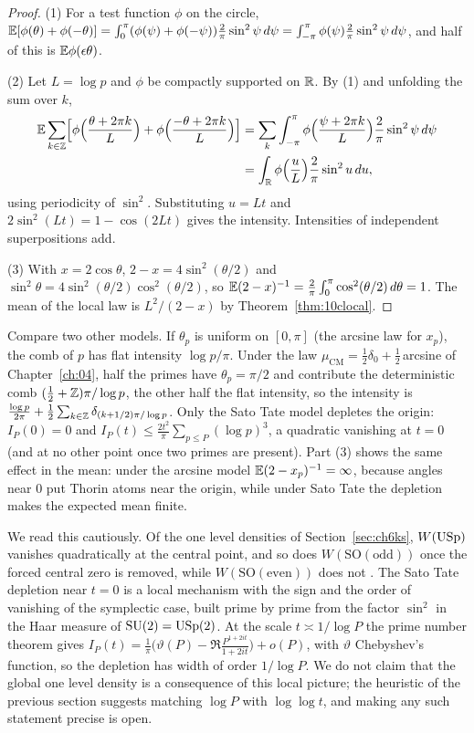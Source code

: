 \begin{proof}
(1) For a test function $\phi$ on the circle, $\mathbb{E}[\phi(\theta)+\phi(-\theta)]=\int_0^\pi(\phi(\psi)+\phi(-\psi))\frac2\pi\sin^2\psi\,d\psi=\int_{-\pi}^{\pi}\phi(\psi)\frac2\pi\sin^2\psi\,d\psi$, and half of this is $\mathbb{E}\phi(\epsilon\theta)$.

(2) Let $L=\log p$ and $\phi$ be compactly supported on $\mathbb{R}$. By (1) and unfolding the sum over $k$,
\begin{align*}
\mathbb{E}\sum_{k\in\mathbb{Z}}\Bigl[\phi\Bigl(\frac{\theta+2\pi k}{L}\Bigr)+\phi\Bigl(\frac{-\theta+2\pi k}{L}\Bigr)\Bigr]&=\sum_k\int_{-\pi}^{\pi}\phi\Bigl(\frac{\psi+2\pi k}{L}\Bigr)\frac2\pi\sin^2\psi\,d\psi\\
&=\int_{\mathbb{R}}\phi\Bigl(\frac uL\Bigr)\frac2\pi\sin^2u\,du,
\end{align*}
using periodicity of $\sin^2$. Substituting $u=Lt$ and $2\sin^2(Lt)=1-\cos(2Lt)$ gives the intensity. Intensities of independent superpositions add.

(3) With $x=2\cos\theta$, $2-x=4\sin^2(\theta/2)$ and $\sin^2\theta=4\sin^2(\theta/2)\cos^2(\theta/2)$, so $\mathbb{E}(2-x)^{-1}=\frac2\pi\int_0^\pi\cos^2(\theta/2)\,d\theta=1$. The mean of the local law is $L^2/(2-x)$ by Theorem~\ref{thm:10clocal}.
\end{proof}

Compare two other models. If $\theta_p$ is uniform on $[0,\pi]$ (the arcsine law for $x_p$), the comb of $p$ has flat intensity $\log p/\pi$. Under the law $\mu_{\mathrm{CM}}=\frac12\delta_0+\frac12\,$arcsine of Chapter~\ref{ch:04}, half the primes have $\theta_p=\pi/2$ and contribute the deterministic comb $(\frac12+\mathbb{Z})\pi/\log p$, the other half the flat intensity, so the intensity is $\frac{\log p}{2\pi}+\frac12\sum_{k\in\mathbb{Z}}\delta_{(k+1/2)\pi/\log p}$. Only the Sato Tate model depletes the origin: $I_P(0)=0$ and $I_P(t)\le\frac{2t^2}{\pi}\sum_{p\le P}(\log p)^3$, a quadratic vanishing at $t=0$ (and at no other point once two primes are present). Part (3) shows the same effect in the mean: under the arcsine model $\mathbb{E}(2-x_p)^{-1}=\infty$, because angles near $0$ put Thorin atoms near the origin, while under Sato Tate the depletion makes the expected mean finite.

We read this cautiously. Of the one level densities of Section~\ref{sec:ch6ks}, $W(\mathrm{USp})$ vanishes quadratically at the central point, and so does $W(\mathrm{SO(odd)})$ once the forced central zero is removed, while $W(\mathrm{SO(even)})$ does not \cite{ils2000,katzsarnak1999}. The Sato Tate depletion near $t=0$ is a local mechanism with the sign and the order of vanishing of the symplectic case, built prime by prime from the factor $\sin^2$ in the Haar measure of $\mathrm{SU}(2)=\mathrm{USp}(2)$. At the scale $t\asymp1/\log P$ the prime number theorem gives $I_P(t)=\frac1\pi\bigl(\vartheta(P)-\Re\frac{P^{1+2it}}{1+2it}\bigr)+o(P)$, with $\vartheta$ Chebyshev's function, so the depletion has width of order $1/\log P$. We do not claim that the global one level density is a consequence of this local picture; the heuristic of the previous section suggests matching $\log P$ with $\log\log t$, and making any such statement precise is open.

